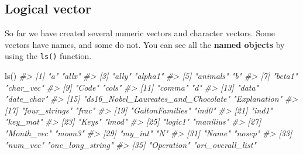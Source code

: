 \documentclass[
]{book}
\newenvironment{Shaded}{\begin{snugshade}}{\end{snugshade}}
\newcommand{\CommentTok}[1]{\textcolor[rgb]{0.56,0.35,0.01}{\textit{#1}}}
\newcommand{\FunctionTok}[1]{\textcolor[rgb]{0.00,0.00,0.00}{#1}}
\newcommand{\NormalTok}[1]{#1}
\begin{document}
\hypertarget{logical-vector}{%
\subsection{Logical vector}\label{logical-vector}}

So far we have created several numeric vectors and character vectors. Some vectors have names, and some do not. You can see all the \textbf{named objects} by using the \texttt{ls()} function.

\begin{Shaded}
\begin{Highlighting}[]
\FunctionTok{ls}\NormalTok{()}
\CommentTok{\#\textgreater{}  [1] "a"                                  "allx"                              }
\CommentTok{\#\textgreater{}  [3] "ally"                               "alpha1"                            }
\CommentTok{\#\textgreater{}  [5] "animals"                            "b"                                 }
\CommentTok{\#\textgreater{}  [7] "beta1"                              "char\_vec"                          }
\CommentTok{\#\textgreater{}  [9] "Code"                               "cols"                              }
\CommentTok{\#\textgreater{} [11] "comma"                              "d"                                 }
\CommentTok{\#\textgreater{} [13] "data"                               "date\_char"                         }
\CommentTok{\#\textgreater{} [15] "ds16\_Nobel\_Laureates\_and\_Chocolate" "Explanation"                       }
\CommentTok{\#\textgreater{} [17] "four\_strings"                       "frac"                              }
\CommentTok{\#\textgreater{} [19] "GaltonFamilies"                     "ind0"                              }
\CommentTok{\#\textgreater{} [21] "ind1"                               "key\_mat"                           }
\CommentTok{\#\textgreater{} [23] "Keys"                               "lmod"                              }
\CommentTok{\#\textgreater{} [25] "logic1"                             "manilius"                          }
\CommentTok{\#\textgreater{} [27] "Month\_vec"                          "moon3"                             }
\CommentTok{\#\textgreater{} [29] "my\_int"                             "N"                                 }
\CommentTok{\#\textgreater{} [31] "Name"                               "nosep"                             }
\CommentTok{\#\textgreater{} [33] "num\_vec"                            "one\_long\_string"                   }
\CommentTok{\#\textgreater{} [35] "Operation"                          "ori\_overall\_list"                  }

\end{Highlighting}
\end{Shaded}
\end{document}
